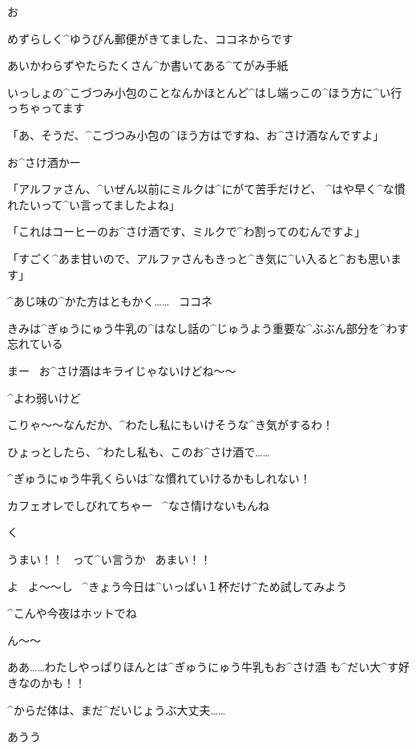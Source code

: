\page
\Alpha お

\page
\Alpha めずらしく^{ゆうびん}{郵便}がきてました、ココネからです

\Alpha あいかわらずやたらたくさん^{か}{書}いてある^{てがみ}{手紙}

\Alpha いっしょの^{こづつみ}{小包}のことなんかほとんど^{はし}{端}っこの^{ほう}{方}に^{い}{行}っちゃってます

\page
\Kokone 「あ、そうだ、^{こづつみ}{小包}の^{ほう}{方}はですね、お^{さけ}{酒}なんですよ」

\Alpha お^{さけ}{酒}かー

\Kokone 「アルファさん、^{いぜん}{以前}にミルクは^{にがて}{苦手}だけど、
  ^{はや}{早}く^{な}{慣}れたいって^{い}{言}ってましたよね」

\Kokone 「これはコーヒーのお^{さけ}{酒}です、ミルクで^{わ}{割}ってのむんですよ」

\Kokone 「すごく^{あま}{甘}いので、アルファさんもきっと^{き}{気}に^{い}{入}ると^{おも}{思}います」

\Alpha ^{あじ}{味}の^{かた}{方}はともかく……
\ ココネ

\Alpha きみは^{ぎゅうにゅう}{牛乳}の^{はなし}{話}の^{じゅうよう}{重要}な^{ぶぶん}{部分}を^{わす}{忘}れている

\page
\Alpha まー
\ お^{さけ}{酒}はキライじゃないけどね〜〜

\Alpha ^{よわ}{弱}いけど

\page[128]
\Alpha こりゃ〜〜なんだか、^{わたし}{私}にもいけそうな^{き}{気}がするわ！

\Alpha ひょっとしたら、^{わたし}{私}も、このお^{さけ}{酒}で……

\Alpha ^{ぎゅうにゅう}{牛乳}くらいは^{な}{慣}れていけるかもしれない！

\Alpha カフェオレでしびれてちゃー
\ ^{なさ}{情}けないもんね

\page
\Alpha く

\Alpha うまい！！
\ って^{い}{言}うか
\ あまい！！

\Alpha よ
\ よ〜〜し
\ ^{きょう}{今日}は^{いっぱい}{１杯}だけ^{ため}{試}してみよう

\page
\Alpha ^{こんや}{今夜}はホットでね

\page
\Alpha ん〜〜

\Alpha ああ……わたしやっぱりほんとは^{ぎゅうにゅう}{牛乳}もお^{さけ}{酒}
も^{だい}{大}^{す}{好}きなのかも！！

\page
\Alpha ^{からだ}{体}は、まだ^{だいじょうぶ}{大丈夫}……

\page
\Alpha あうう

